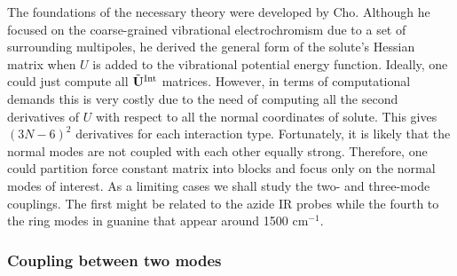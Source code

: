 \documentclass[a4paper,titlepage,twoside,fleqn,12pt]{book}
\begin{document}
\begin{refsection}
The foundations of the necessary theory were developed
by Cho.\citep{Cho.JCP.2009} Although he focused on the coarse\hyp{}grained
vibrational electrochromism due to a set of surrounding
multipoles, he derived the general form of the solute's
Hessian matrix when $U$ is added to the vibrational potential
energy function. Ideally, one could just compute all
$\tilde{\bf U}^{\rm Int}$ matrices. However, in terms of
computational demands this is very costly due to the
need of computing all the second derivatives of $U$
with respect to all the normal coordinates of solute.
This gives $(3N-6)^2$ derivatives for each interaction
type. Fortunately, it is likely that the normal modes
are not coupled with each other equally strong. Therefore,
one could partition force constant matrix into blocks
and focus only on the normal modes of interest. As a limiting
cases we shall study the two\hyp{} and three\hyp{}mode
couplings. The first might be related to the azide IR probes
while the fourth to the ring modes in guanine that appear around
1500 cm$^{-1}$.

\subsubsection{Coupling between two modes}


\end{refsection}
\end{document}
